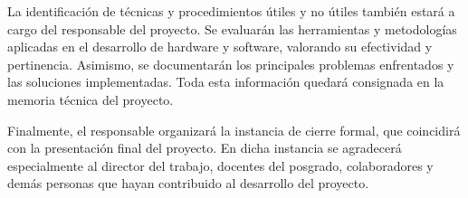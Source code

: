 \documentclass[
11pt, %
]{charter}
\begin{document}
La identificación de técnicas y procedimientos útiles y no útiles también estará a cargo del responsable del proyecto. Se evaluarán las herramientas y metodologías aplicadas en el desarrollo de hardware y software, valorando su efectividad y pertinencia. Asimismo, se documentarán los principales problemas enfrentados y las soluciones implementadas. Toda esta información quedará consignada en la memoria técnica del proyecto.

Finalmente, el responsable organizará la instancia de cierre formal, que coincidirá con la presentación final del proyecto. En dicha instancia se agradecerá especialmente al director del trabajo, docentes del posgrado, colaboradores y demás personas que hayan contribuido al desarrollo del proyecto.
\end{document}
